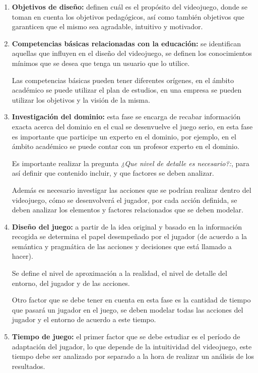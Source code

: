 \begin{enumerate}
\item \textbf{Objetivos de diseño:} definen cuál es el propósito del videojuego, donde
    se toman en cuenta los objetivos pedagógicos, así como también objetivos que
    garanticen que el mismo sea agradable, intuitivo y motivador.

\item \textbf{Competencias básicas relacionadas con la educación:} se identifican
    aquellas que influyen en el diseño del videojuego, se definen los conocimientos
    mínimos que se desea que tenga un usuario que lo utilice.

Las competencias básicas pueden tener diferentes orígenes, en el ámbito
académico se puede utilizar el plan de estudios, en una empresa se pueden
utilizar los objetivos y la visión de la misma.

\item \textbf{Investigación del dominio:} esta fase se encarga de recabar
    información exacta acerca del dominio en el cual se desenvuelve el juego
    serio, en esta fase es importante que participe un experto en el dominio,
    por ejemplo, en el ámbito académico se puede contar con un profesor experto
    en el dominio.

Es importante realizar la pregunta \emph{¿Que nivel de detalle es necesario?:},
para así definir que contenido incluir, y que factores se deben analizar.

Además es necesario investigar las acciones que se podrían realizar dentro del
videojuego, cómo se desenvolverá el jugador, por cada acción definida, se deben
analizar los elementos y factores relacionados que se deben modelar.

\item \textbf{Diseño del juego:} a partir de la idea original y basado en la
    información recogida se determina el papel desempeñado por el jugador (de
    acuerdo a la semántica y pragmática de las acciones y decisiones que está
    llamado a hacer). 

Se define el nivel de aproximación a la realidad, el nivel de detalle del
entorno, del jugador y de las acciones.

Otro factor que se debe tener en cuenta en esta fase es la cantidad de tiempo
que pasará un jugador en el juego, se deben modelar todas las acciones del
jugador y el entorno de acuerdo a este tiempo.

\item \textbf{Tiempo de juego:} el primer factor que se debe estudiar es el
    período de adaptación del jugador, lo que depende de la intuitividad del
    videojuego, este tiempo debe ser analizado por separado a la hora de realizar un
    análisis de los resultados.


\end{enumerate}
